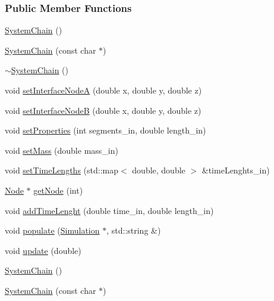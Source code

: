 \subsubsection*{Public Member Functions}
\begin{DoxyCompactItemize}
\item 
\hyperlink{classmknix_1_1_system_chain_a622291871876800c9f91cffddc41b1a2}{System\+Chain} ()
\item 
\hyperlink{classmknix_1_1_system_chain_ad83a78442779c22e35b36350f5f313fe}{System\+Chain} (const char $\ast$)
\item 
\hyperlink{classmknix_1_1_system_chain_a1cf65bbe0b9f8ce2dc6d24eebff0d93c}{$\sim$\+System\+Chain} ()
\item 
void \hyperlink{classmknix_1_1_system_chain_aa82626e78fb83ddee9114e7d7b7df34a}{set\+Interface\+Node\+A} (double x, double y, double z)
\item 
void \hyperlink{classmknix_1_1_system_chain_a3f331ac3848bbedef2bea718489b9ee6}{set\+Interface\+Node\+B} (double x, double y, double z)
\item 
void \hyperlink{classmknix_1_1_system_chain_a571be0a127e9a3eee1c6e5609b083a5d}{set\+Properties} (int segments\+\_\+in, double length\+\_\+in)
\item 
void \hyperlink{classmknix_1_1_system_chain_a005f33286a77d8492d164eef69cf2798}{set\+Mass} (double mass\+\_\+in)
\item 
void \hyperlink{classmknix_1_1_system_chain_a0add7512af477795f9cc7ef0ff39e1ec}{set\+Time\+Lengths} (std\+::map$<$ double, double $>$ \&time\+Lenghts\+\_\+in)
\item 
\hyperlink{classmknix_1_1_node}{Node} $\ast$ \hyperlink{classmknix_1_1_system_chain_a549c63c17b03cca460ae87e3f63379c2}{get\+Node} (int)
\item 
void \hyperlink{classmknix_1_1_system_chain_aa4d8adf858228a1f3d5742f394c77187}{add\+Time\+Lenght} (double time\+\_\+in, double length\+\_\+in)
\item 
void \hyperlink{classmknix_1_1_system_chain_a5d35273a452ece7b04251ab206c2b63d}{populate} (\hyperlink{classmknix_1_1_simulation}{Simulation} $\ast$, std\+::string \&)
\item 
void \hyperlink{classmknix_1_1_system_chain_a9ccb93db731aa96bae11540b035afa18}{update} (double)
\item 
\hyperlink{classmknix_1_1_system_chain_a622291871876800c9f91cffddc41b1a2}{System\+Chain} ()
\item 
\hyperlink{classmknix_1_1_system_chain_ad83a78442779c22e35b36350f5f313fe}{System\+Chain} (const char $\ast$)

\end{DoxyCompactItemize}
